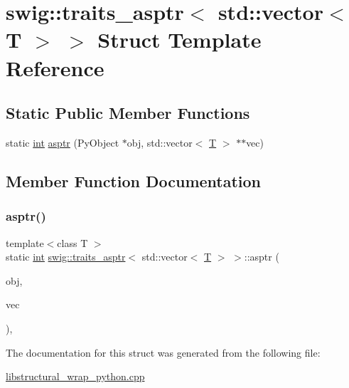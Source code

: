 \hypertarget{structswig_1_1traits__asptr_3_01std_1_1vector_3_01_t_01_4_01_4}{}\section{swig\+:\+:traits\+\_\+asptr$<$ std\+:\+:vector$<$ T $>$ $>$ Struct Template Reference}
\label{structswig_1_1traits__asptr_3_01std_1_1vector_3_01_t_01_4_01_4}
\subsection*{Static Public Member Functions}
\begin{DoxyCompactItemize}
\item 
static \hyperlink{lp__lib_8h_adeb9ec6400320e4923ac9d836d509ddb}{int} \hyperlink{structswig_1_1traits__asptr_3_01std_1_1vector_3_01_t_01_4_01_4_abffecd25e704a44cd75d02ccde1efbe4}{asptr} (Py\+Object $\ast$obj, std\+::vector$<$ \hyperlink{fmt_8h_a0acb682b8260ab1c60b918599864e2e5}{T} $>$ $\ast$$\ast$vec)
\end{DoxyCompactItemize}


\subsection{Member Function Documentation}
\mbox{\label{structswig_1_1traits__asptr_3_01std_1_1vector_3_01_t_01_4_01_4_abffecd25e704a44cd75d02ccde1efbe4}} 
\subsubsection{\texorpdfstring{asptr()}{asptr()}}
{\footnotesize\ttfamily template$<$class T $>$ \\
static \hyperlink{lp__lib_8h_adeb9ec6400320e4923ac9d836d509ddb}{int} \hyperlink{structswig_1_1traits__asptr}{swig\+::traits\+\_\+asptr}$<$ std\+::vector$<$ \hyperlink{fmt_8h_a0acb682b8260ab1c60b918599864e2e5}{T} $>$ $>$\+::asptr (\begin{DoxyParamCaption}\item[{Py\+Object $\ast$}]{obj,  }\item[{std\+::vector$<$ \hyperlink{fmt_8h_a0acb682b8260ab1c60b918599864e2e5}{T} $>$ $\ast$$\ast$}]{vec }\end{DoxyParamCaption})\hspace{0.3cm}{\ttfamily [inline]}, {\ttfamily [static]}}



The documentation for this struct was generated from the following file\+:\begin{DoxyCompactItemize}
\item 
\hyperlink{libstructural__wrap__python_8cpp}{libstructural\+\_\+wrap\+\_\+python.\+cpp}\end{DoxyCompactItemize}
